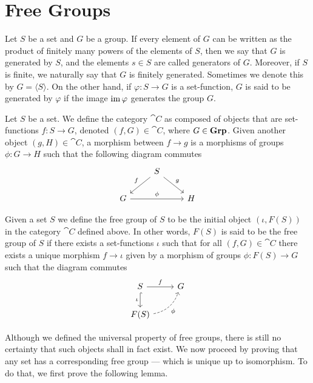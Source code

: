 \section{Free Groups}

\begin{definition}
\label{def:group-generated}
Let \(S\) be a set and \(G\) be a group. If every element of \(G\) can be
written as the product of finitely many powers of the elements of \(S\), then we
say that \(G\) is generated by \(S\), and the elements \(s \in S\) are called
generators of \(G\). Moreover, if \(S\) is finite, we naturally say that \(G\)
is finitely generated. Sometimes we denote this by \(G = \langle S \rangle\).
On the other hand, if \(\varphi: S \to G\) is a set-function, \(G\) is said to
be generated by \(\varphi\) if the image \(\operatorname{im} \varphi\) generates the group
\(G\).
\end{definition}

Let \(S\) be a set. We define the category \(\cat C\) as composed of objects
that are set-functions \(f: S \to G\), denoted \((f, G) \in \cat C\), where \(G
\in {\textbf{Grp}}\). Given another object \((g, H) \in \cat C\), a morphism between \(f
\to g\) is a morphisms of groups \(\phi: G \to H\) such that the following
diagram commutes
\[
  \begin{tikzcd}
    &S \ar[dr, "g"] \ar[dl, swap, "f"] & \\
    G \ar[rr, "\phi"] & &H
  \end{tikzcd}
\]

\begin{proposition}
\label{prop:free-group-universal-property}
Given a set \(S\) we define the free group of \(S\) to be the initial object
\((\iota, F(S))\) in the category \(\cat C\) defined above. In other words,
\(F(S)\) is said to be the free group of \(S\) if there exists a set-functions
\(\iota\) such that for all \((f, G) \in \cat C\) there exists a unique morphism
\(f \to \iota\) given by a morphism of groups \(\phi: F(S) \to G\) such that the
diagram commutes
\[
  \begin{tikzcd}
    S \ar[d, swap, hook, "\iota"] \ar[r, "f"] & G \\
    F(S) \ar[ur, dashed, bend right, swap, "\phi"] &
  \end{tikzcd}
\]
\end{proposition}

Although we defined the universal property of free groups, there is still no
certainty that such objects shall in fact exist. We now proceed by proving that
any set has a corresponding free group --- which is unique up to isomorphism. To
do that, we first prove the following lemma.

